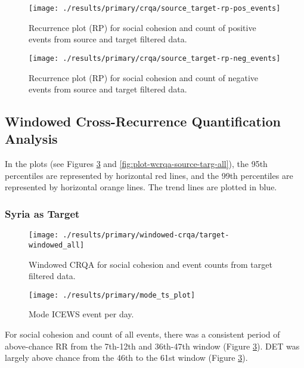 \documentclass[english,man]{apa6}
\begin{document}
\begin{figure}
\texttt{[image: ./results/primary/crqa/source\_target-rp-pos\_events]} \caption{Recurrence plot (RP) for social cohesion and count of positive events from source and target filtered data.}\label{fig:plot-rp-source-targ-pos}
\end{figure}

\begin{figure}
\texttt{[image: ./results/primary/crqa/source\_target-rp-neg\_events]} \caption{Recurrence plot (RP) for social cohesion and count of negative events from source and target filtered data.}\label{fig:plot-rp-source-targ-neg}
\end{figure}

\hypertarget{windowed-cross-recurrence-quantification-analysis-1}{%
\subsection{Windowed Cross-Recurrence Quantification Analysis}\label{windowed-cross-recurrence-quantification-analysis-1}}

In the plots (see Figures \ref{fig:plot-wcrqa-targ-all} and
\ref{fig:plot-wcrqa-source-targ-all}), the 95th percentiles are represented
by horizontal red lines, and the 99th percentiles are
represented by horizontal orange lines. The trend lines are plotted in blue.

\hypertarget{syria-as-target-1}{%
\subsubsection{Syria as Target}\label{syria-as-target-1}}

\begin{figure}
\texttt{[image: ./results/primary/windowed-crqa/target-windowed\_all]} \caption{Windowed CRQA for social cohesion and event counts from target filtered data.}\label{fig:plot-wcrqa-targ-all}
\end{figure}

\begin{figure}
\texttt{[image: ./results/primary/mode\_ts\_plot]} \caption{Mode ICEWS event per day.}\label{fig:plot-mode-event}
\end{figure}

For social cohesion and count of all events, there was a consistent period
of above-chance RR from the 7th-12th and 36th-47th window
(Figure \ref{fig:plot-wcrqa-targ-all}). DET was largely above chance
from the 46th to the 61st window (Figure \ref{fig:plot-wcrqa-targ-all}).
\end{document}
